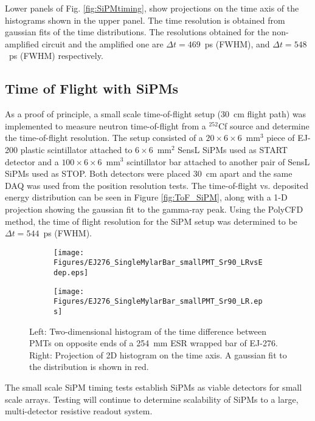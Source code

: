 Lower panels of Fig. \ref{fig:SiPMtiming}, show projections on the time axis of the histograms shown in the upper panel. The time resolution is obtained from  gaussian fits of the time distributions. The resolutions obtained for the non-amplified circuit and the amplified one are $\Delta t=469$~ps (FWHM), and $\Delta t=548$~ps (FWHM) respectively.

\subsection{Time of Flight with SiPMs}

As a proof of principle, a small scale time-of-flight setup (30~cm flight path) was implemented to measure neutron time-of-flight from a $^{252}$Cf source and determine the time-of-flight resolution. The setup consisted of a $20\times6\times6$~mm$^3$  piece of EJ-200 plastic scintillator attached to $6\times6$~mm$^2$ SensL\textsuperscript{\textregistered} SiPMs used as START detector and a  $100\times6\times6$~mm$^3$ scintillator bar attached to another pair of SensL\textsuperscript{\textregistered} SiPMs used as STOP. Both detectors were placed 30~cm apart and the same DAQ was used from the position resolution tests. The time-of-flight vs. deposited energy distribution can be seen in Figure \ref{fig:ToF_SiPM}, along with a 1-D projection showing the gaussian fit to the gamma-ray peak. Using the PolyCFD method, the time of flight resolution for the SiPM setup was determined to be $\Delta t=544$~ps (FWHM).
\begin{figure}[bt]
  \centering
  \begin{subfigure}{0.5\linewidth}
    \raggedleft
    \texttt{[image: Figures/EJ276\_SingleMylarBar\_smallPMT\_Sr90\_LRvsEdep.eps]}
  \end{subfigure}%
  \begin{subfigure}{0.5\linewidth}
    \raggedright
    \texttt{[image: Figures/EJ276\_SingleMylarBar\_smallPMT\_Sr90\_LR.eps]}
  \end{subfigure}%
  \caption{Left: Two-dimensional histogram of the time difference between PMTs on opposite ends of a 254~mm ESR wrapped bar of EJ-276. Right: Projection of 2D histogram on the time axis. A gaussian fit to the distribution is shown in red.}
  \label{fig:MylarTiming}
\end{figure}

The small scale SiPM timing tests establish SiPMs as viable detectors for small scale arrays. Testing will continue to determine scalability of SiPMs to a large, multi-detector resistive readout system.

